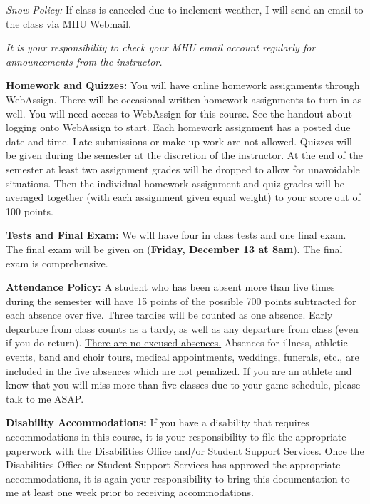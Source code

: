 \documentclass[12pt]{article}
\begin{document}
\textit{Snow Policy:}
If class is canceled due to inclement weather, I will send an email to the class via MHU Webmail.

\textit{It is your responsibility to check your MHU email account regularly for announcements from the instructor.}

\vspace{.1 in}
\noindent\textbf{Homework and Quizzes:}
You will have online homework assignments through WebAssign.  There will be occasional written homework assignments to turn in as well.  You will need access to WebAssign for this course.  See the handout about logging onto WebAssign to start.  Each homework assignment has a posted due date and time.  Late submissions or make up work are not allowed.  Quizzes will be given during the semester at the discretion of the instructor.   At the end of the semester at least two assignment grades will be dropped to allow for unavoidable situations.  Then the individual homework assignment and quiz grades will be averaged together (with each assignment given equal weight) to your score out of 100 points.

\vspace{.1 in}
\noindent\textbf{Tests and Final Exam:}
 We will have four in class tests and one
final exam.  The
final exam will be given on ({\bf Friday, December 13 at 8am}). The final exam is comprehensive.

\vspace{.1 in}
 \noindent\textbf{Attendance Policy:}
A student who has been absent more than five times during the semester will have 15 points of the possible 700 points subtracted for each absence over five.  Three tardies will be counted as one absence.  Early departure from class counts as a tardy, as well as any departure from class (even if you do return).  \underline{There are no excused absences.}  Absences for illness, athletic events, band and choir tours, medical appointments, weddings, funerals, etc., are included in the five absences which are not penalized.  If you are an athlete and know that you will miss more than five classes due to your game schedule, please talk to me ASAP.

\vspace{.1 in}
\noindent\textbf{Disability Accommodations:} If you have a disability that requires accommodations in this course, it is your responsibility to file the appropriate paperwork with the Disabilities Office and/or Student Support Services.  Once the Disabilities Office or Student Support Services has approved the appropriate accommodations, it is again your responsibility to bring this documentation to me at least one week prior to receiving accommodations.
\end{document}
